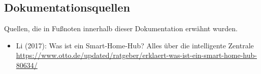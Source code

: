 \subsection{Dokumentationsquellen}
Quellen, die in Fußnoten innerhalb dieser Dokumentation erwähnt wurden.
\begin{itemize}
 		\item Li (2017): Was ist ein Smart-Home-Hub? Alles über die intelligente Zentrale\\ {\url{https://www.otto.de/updated/ratgeber/erklaert-was-ist-ein-smart-home-hub-80634/}}
\end{itemize}